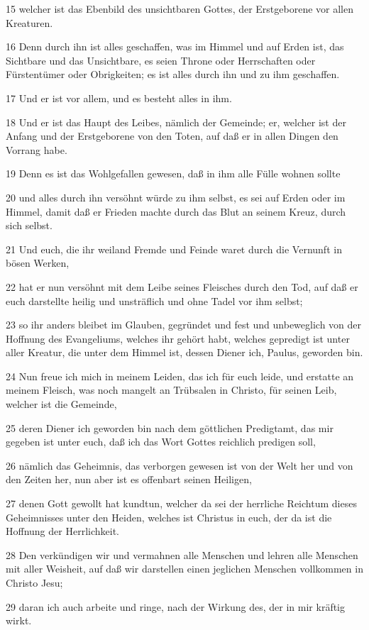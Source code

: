 \par 15 welcher ist das Ebenbild des unsichtbaren Gottes, der Erstgeborene vor allen Kreaturen.
\par 16 Denn durch ihn ist alles geschaffen, was im Himmel und auf Erden ist, das Sichtbare und das Unsichtbare, es seien Throne oder Herrschaften oder Fürstentümer oder Obrigkeiten; es ist alles durch ihn und zu ihm geschaffen.
\par 17 Und er ist vor allem, und es besteht alles in ihm.
\par 18 Und er ist das Haupt des Leibes, nämlich der Gemeinde; er, welcher ist der Anfang und der Erstgeborene von den Toten, auf daß er in allen Dingen den Vorrang habe.
\par 19 Denn es ist das Wohlgefallen gewesen, daß in ihm alle Fülle wohnen sollte
\par 20 und alles durch ihn versöhnt würde zu ihm selbst, es sei auf Erden oder im Himmel, damit daß er Frieden machte durch das Blut an seinem Kreuz, durch sich selbst.
\par 21 Und euch, die ihr weiland Fremde und Feinde waret durch die Vernunft in bösen Werken,
\par 22 hat er nun versöhnt mit dem Leibe seines Fleisches durch den Tod, auf daß er euch darstellte heilig und unsträflich und ohne Tadel vor ihm selbst;
\par 23 so ihr anders bleibet im Glauben, gegründet und fest und unbeweglich von der Hoffnung des Evangeliums, welches ihr gehört habt, welches gepredigt ist unter aller Kreatur, die unter dem Himmel ist, dessen Diener ich, Paulus, geworden bin.
\par 24 Nun freue ich mich in meinem Leiden, das ich für euch leide, und erstatte an meinem Fleisch, was noch mangelt an Trübsalen in Christo, für seinen Leib, welcher ist die Gemeinde,
\par 25 deren Diener ich geworden bin nach dem göttlichen Predigtamt, das mir gegeben ist unter euch, daß ich das Wort Gottes reichlich predigen soll,
\par 26 nämlich das Geheimnis, das verborgen gewesen ist von der Welt her und von den Zeiten her, nun aber ist es offenbart seinen Heiligen,
\par 27 denen Gott gewollt hat kundtun, welcher da sei der herrliche Reichtum dieses Geheimnisses unter den Heiden, welches ist Christus in euch, der da ist die Hoffnung der Herrlichkeit.
\par 28 Den verkündigen wir und vermahnen alle Menschen und lehren alle Menschen mit aller Weisheit, auf daß wir darstellen einen jeglichen Menschen vollkommen in Christo Jesu;
\par 29 daran ich auch arbeite und ringe, nach der Wirkung des, der in mir kräftig wirkt.

